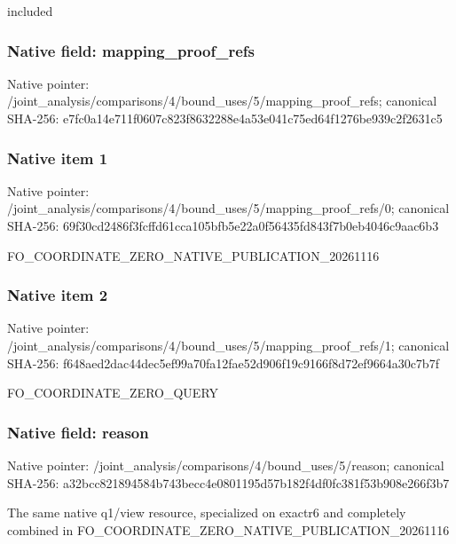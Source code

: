 \documentclass[10pt,a4paper]{article}
\begin{document}
\begingroup\raggedright\sloppy included\par\endgroup

\subsubsection{Native field: mapping\_\allowbreak{}proof\_\allowbreak{}refs}
Native pointer: /joint\_\allowbreak{}analysis/comparisons/4/bound\_\allowbreak{}uses/5/mapping\_\allowbreak{}proof\_\allowbreak{}refs; canonical SHA-256: e7fc0a14e711f0607c823f8632288e4a53e041c75ed64f1276be939c2f2631c5

\subsubsection{Native item 1}
Native pointer: /joint\_\allowbreak{}analysis/comparisons/4/bound\_\allowbreak{}uses/5/mapping\_\allowbreak{}proof\_\allowbreak{}refs/0; canonical SHA-256: 69f30cd2486f3fcffd61cca105bfb5e22a0f56435fd843f7b0eb4046c9aac6b3

\begingroup\raggedright\sloppy FO\_\allowbreak{}COORDINATE\_\allowbreak{}ZERO\_\allowbreak{}NATIVE\_\allowbreak{}PUBLICATION\_\allowbreak{}20261116\par\endgroup

\subsubsection{Native item 2}
Native pointer: /joint\_\allowbreak{}analysis/comparisons/4/bound\_\allowbreak{}uses/5/mapping\_\allowbreak{}proof\_\allowbreak{}refs/1; canonical SHA-256: f648aed2dac44dec5ef99a70fa12fae52d906f19c9166f8d72ef9664a30c7b7f

\begingroup\raggedright\sloppy FO\_\allowbreak{}COORDINATE\_\allowbreak{}ZERO\_\allowbreak{}QUERY\par\endgroup

\subsubsection{Native field: reason}
Native pointer: /joint\_\allowbreak{}analysis/comparisons/4/bound\_\allowbreak{}uses/5/reason; canonical SHA-256: a32bcc821894584b743becc4e0801195d57b182f4df0fc381f53b908e266f3b7

\begingroup\raggedright\sloppy The same native q1/\allowbreak{}view resource,\allowbreak{} specialized on exactr6 and completely combined in FO\_\allowbreak{}COORDINATE\_\allowbreak{}ZERO\_\allowbreak{}NATIVE\_\allowbreak{}PUBLICATION\_\allowbreak{}20261116\par\endgroup
\end{document}
